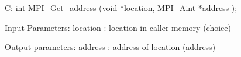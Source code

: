 C:
int MPI_Get_address
   (void *location,
    MPI_Aint *address
    );

Input Parameters:
location : location in caller memory (choice)

Output parameters:
address : address of location (address)
